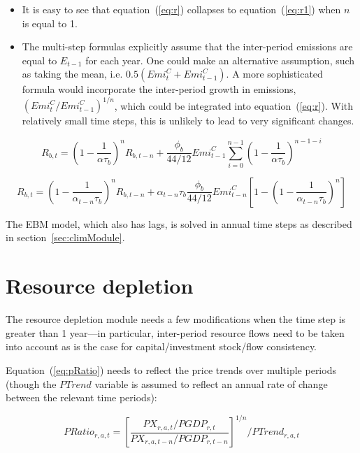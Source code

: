 \begin{itemize}
\item It is easy to see that equation~(\ref{eq:r}) collapses to equation~(\ref{eq:r1})
when $n$ is equal  to 1.
\item 
The multi-step formulas explicitly assume that the
inter-period emissions are equal to $E_{t-1}$ for each year. One could make
an alternative assumption, such as taking the mean, i.e. $0.5(\mathit{Emi}^C_t + \mathit{Emi}^C_{t-1})$.
A more sophisticated formula would incorporate the inter-period growth in emissions,
$(\mathit{Emi}^C_t/\mathit{Emi}^C_{t-1})^{1/n}$, which could be integrated into equation~(\ref{eq:r}). With
relatively small time steps, this is unlikely to lead to very significant changes.
\end{itemize}

\begin{equation}
\label{eq:rn}
\mathit{R}_{b,t} = \left(1 - \displaystyle \frac {1}{\alpha \tau_b} \right)^{n} {\mathit{R}_{b,t-n}} + \frac{\phi_b}{44/12} \mathit{Emi}^C_{t-1} \sum_{i=0}^{n-1}{\left(1 - \displaystyle \frac {1}{\alpha \tau_b} \right)^{n-1-i}}
\end{equation}

\begin{equation}
\label{eq:r}
\mathit{R}_{b,t} =  \left(1 - \displaystyle \frac {1}{\alpha_{t-n} \tau_b} \right)^{n} {\mathit{R}_{b,t-n}}
+ {\alpha_{t-n} \tau_b} \frac{\phi_b}{44/12} \mathit{Emi}^C_{t-n} 
\left[1 - 
\left(1 - \displaystyle \frac {1}{\alpha_{t-n} \tau_b} \right)^{n} 
\right]
\end{equation}

The EBM model, which also has lags, is solved in annual time steps as described
in section~\ref{sec:climModule}.

\section{Resource depletion}

The resource depletion module needs a few modifications when 
the time step is greater than 1 year---in particular, inter-period
resource flows need to be taken into account as is the case for capital/investment
stock/flow consistency.

Equation~(\ref{eq:pRatio}) needs to reflect the price trends over multiple
periods (though the $\mathit{PTrend}$ variable is assumed to reflect an annual rate of change between the relevant time periods):

\begin{equation}
\label{eq:pRatiodyn}
\mathit{PRatio}_{r,a,t} = \left[ \frac{\mathit{PX}_{r,a,t}/\mathit{PGDP}_{r,t}} {\mathit{PX}_{r,a,t-n}/\mathit{PGDP}_{r,t-n}} \right]^{1/n} \bigg / \mathit{PTrend}_{r,a,t} 
\end{equation}

